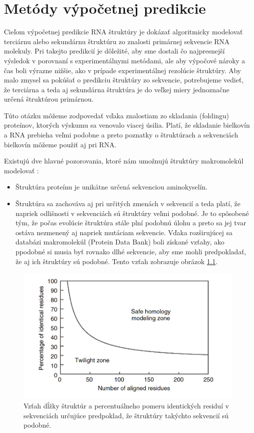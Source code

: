 \chapter{Metódy výpočetnej predikcie}
Cieľom výpočetnej predikcie RNA štruktúry je dokázať algoritmicky modelovať terciárnu alebo sekundárnu štruktúru zo znalosti primárnej sekvencie RNA molekuly. Pri takejto predikcií je dôležité, aby sme dostali čo najpresnejší výsledok v porovnaní s experimentálnymi metódami, ale aby výpočové nároky a čas boli výrazne nižšie, ako v prípade experimentálnej rezolúcie štruktúry. Aby malo zmysel sa pokúšať o predikciu štruktúry zo sekvencie, potrebujeme vedieť, že terciárna a teda aj sekundárna štruktúra je do veľkej miery jednoznačne určená štruktúrou primárnou.  


\indent Túto otázku môžeme zodpovedať vďaka znalostiam zo skladania (foldingu) proteínov, ktorých výskumu sa venovalo viacej úsilia. Platí, že skladanie bielkovín a RNA prebieha veľmi podobne a preto poznatky o štruktúrach a sekvenciách bielkovín môžeme použiť aj pri RNA. \cite{Moore99} 


\indent  Existujú dve hlavné pozorovania, ktoré nám umožnujú štruktúry makromolekúl modelovať  \cite{Jenny09}:
\begin{itemize}
\item Štruktúra proteínu je unikátne určená sekvenciou aminokyselín.
\item Štruktúra sa zachováva aj pri určitých zmenách v sekvencií a teda platí, že napriek odlišnosti v sekvenciách sú štruktúry veľmi podobné. Je to spôsobené tým, že počas evolúcie štruktúra stále plní podobnú úlohu a preto sa jej tvar ostáva nezmenený aj napriek mutáciam sekvencie. Vďaka rozširujúcej sa databázi makromolekúl (Protein Data Bank) boli získané vzťahy, ako ppodobné si musia byť rovnako dlhé sekvencie, aby sme mohli predpokladať, že aj ich štruktúry sú podobné. Tento vzťah zobrazuje obrázok  \ref{obr01:aln-zones}.
\end{itemize}

\begin{figure}%
\includegraphics[width=\textwidth]{../img/zones_of_aln}
\caption{Vzťah dĺžky štruktúr a percentuálneho pomeru identických residuí v sekvenciách určujúce predpoklad, že štruktúry takýchto sekvencií sú podobné. \cite{Jenny09}}
\label{obr01:aln-zones}
\end{figure}

